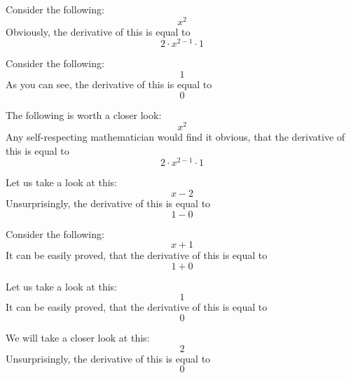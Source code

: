 \documentclass{article}
\begin{document}
Consider the following:
\begin{equation}
x ^{2 } 
\end{equation}
Obviously, the derivative of this is equal to
\begin{equation}
2 \cdot x ^{2 - 1 } \cdot 1 
\end{equation}

Consider the following:
\begin{equation}
1 
\end{equation}
As you can see, the derivative of this is equal to
\begin{equation}
0 
\end{equation}

The following is worth a closer look:
\begin{equation}
x ^{2 } 
\end{equation}
Any self-respecting mathematician would find it obvious, that the derivative of this is equal to
\begin{equation}
2 \cdot x ^{2 - 1 } \cdot 1 
\end{equation}

Let us take a look at this:
\begin{equation}
x - 2 
\end{equation}
Unsurprisingly, the derivative of this is equal to
\begin{equation}
1 - 0 
\end{equation}

Consider the following:
\begin{equation}
x + 1 
\end{equation}
It can be easily proved, that the derivative of this is equal to
\begin{equation}
1 + 0 
\end{equation}

Let us take a look at this:
\begin{equation}
1 
\end{equation}
It can be easily proved, that the derivative of this is equal to
\begin{equation}
0 
\end{equation}

We will take a closer look at this:
\begin{equation}
2 
\end{equation}
Unsurprisingly, the derivative of this is equal to
\begin{equation}
0 
\end{equation}
\end{document}
